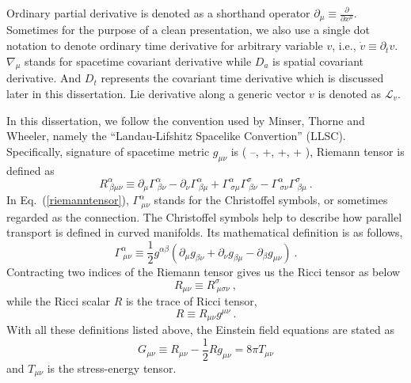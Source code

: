 Ordinary partial derivative is denoted as a shorthand operator $
\partial_{\mu} \equiv \frac{\partial}{\partial x^{\mu}}$. Sometimes for the purpose of a clean presentation, we also use a single dot notation to denote ordinary time derivative for arbitrary variable $v$, i.e., ${\dot v} \equiv \partial_{t}v$. $\nabla_{\mu}$ stands for spacetime covariant derivative while $D_{a}$ is spatial covariant derivative. And $D_{t}$ represents the covariant time derivative which is discussed later in this dissertation. Lie derivative along a generic vector $v$ is denoted as $\mathcal{L}_{v}$. 

In this dissertation, we follow the convention used by Minser, Thorne and Wheeler\cite{Misner:1974qy}, namely the ``Landau-Lifshitz Spacelike Convertion'' (LLSC). Specifically, signature of spacetime metric $g_{\mu\nu}$ is ( --, +, +, + ), Riemann tensor is defined as 
\begin{equation}\label{riemanntensor}
	R^{\alpha}_{~\beta \mu \nu} \equiv 
	\partial_{\mu}\Gamma^{\alpha}_{~\beta \nu} - 
	\partial_{\nu}\Gamma^{\alpha}_{~\beta \mu} + \Gamma^{\alpha}_{~\sigma \mu}\Gamma^{\sigma}_{~\beta \nu} - \Gamma^{\alpha}_{~\sigma \nu}\Gamma^{\sigma}_{~\beta\mu} \ .
\end{equation}
In Eq.~(\ref{riemanntensor}), $\Gamma^{\alpha}_{~\mu\nu}$ stands for the Christoffel symbols, or sometimes regarded as the connection. The Christoffel symbols help to describe how parallel transport is defined in curved manifolds. Its mathematical definition is as follows, 
\begin{equation}
	\Gamma^{\alpha}_{~\mu\nu} \equiv \frac{1}{2}g^{\alpha\beta}\left(\partial_{\mu}g_{\beta\nu} + \partial_{\nu}g_{\beta\mu} - \partial_{\beta}g_{\mu\nu}\right) \ .
\end{equation}
Contracting two indices of the Riemann tensor gives us the Ricci tensor as below
\begin{equation}
	R_{\mu\nu} \equiv R^{\sigma}_{~\mu\sigma\nu} \ ,  
\end{equation}
while the Ricci scalar $R$ is the trace of Ricci tensor, 
\begin{equation}
	R \equiv R_{\mu\nu}g^{\mu\nu}\ .
\end{equation}
With all these definitions listed above, the Einstein field equations are stated as 
\begin{equation}
	G_{\mu\nu} \equiv R_{\mu\nu} - \frac{1}{2} R g_{\mu\nu} = 8\pi T_{\mu\nu} 
\end{equation}
and $T_{\mu\nu}$ is the stress-energy tensor. 

